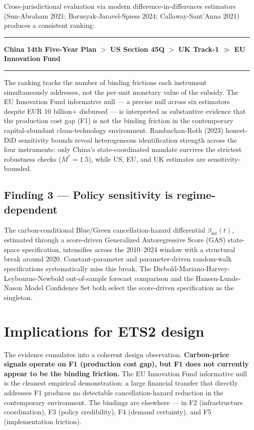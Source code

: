 \documentclass[11pt,a4paper]{article}
\newcommand{\bint}{\beta_{\text{int}}}
\begin{document}
Cross-jurisdictional evaluation via modern difference-in-differences estimators (Sun-Abraham 2021; Borusyak-Jaravel-Spiess 2024; Callaway-Sant'Anna 2021) produces a consistent ranking:

\vspace{0.4em}

\medskip
\hrule
\vspace{0.4em}
\centering
\textbf{China 14th Five-Year Plan} $>$ \textbf{US Section 45Q} $>$ \textbf{UK Track-1} $\gg$ \textbf{EU Innovation Fund}
\vspace{0.2em}
\hrule
\medskip

\vspace{0.4em}

The ranking tracks the number of binding frictions each instrument simultaneously addresses, not the per-unit monetary value of the subsidy. The EU Innovation Fund informative null --- a precise null across six estimators despite EUR 10 billion+ disbursed --- is interpreted as substantive evidence that the production cost gap (F1) is not the binding friction in the contemporary capital-abundant clean-technology environment. Rambachan-Roth (2023) honest-DiD sensitivity bounds reveal heterogeneous identification strength across the four instruments: only China's state-coordinated mandate survives the strictest robustness checks ($M^* = 1.5$), while US, EU, and UK estimates are sensitivity-bounded.

\subsection*{Finding 3 --- Policy sensitivity is regime-dependent}

The carbon-conditional Blue/Green cancellation-hazard differential $\bint(t)$, estimated through a score-driven Generalized Autoregressive Score (GAS) state-space specification, intensifies across the 2010--2024 window with a structural break around 2020. Constant-parameter and parameter-driven random-walk specifications systematically miss this break. The Diebold-Mariano-Harvey-Leybourne-Newbold out-of-sample forecast comparison and the Hansen-Lunde-Nason Model Confidence Set both select the score-driven specification as the singleton.

\section{Implications for ETS2 design}

The evidence cumulates into a coherent design observation. \textbf{Carbon-price signals operate on F1 (production cost gap), but F1 does not currently appear to be the binding friction.} The EU Innovation Fund informative null is the cleanest empirical demonstration: a large financial transfer that directly addresses F1 produces no detectable cancellation-hazard reduction in the contemporary environment. The bindings are elsewhere --- in F2 (infrastructure coordination), F3 (policy credibility), F4 (demand certainty), and F5 (implementation friction).
\end{document}
